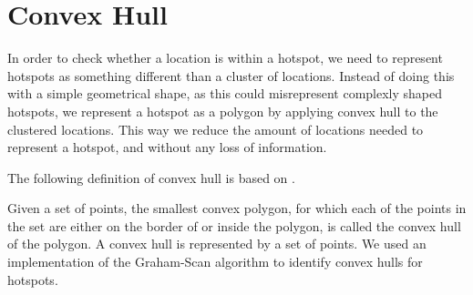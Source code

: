 \section{Convex Hull}\label{convex_hull}
In order to check whether a location is within a hotspot, we need to represent hotspots as something different than a cluster of locations.
Instead of doing this with a simple geometrical shape, as this could misrepresent complexly shaped hotspots, we represent a hotspot as a polygon by applying convex hull to the clustered locations.
This way we reduce the amount of locations needed to represent a hotspot, and without any loss of information.

The following definition of convex hull is based on \citet[section 33.3]{aadbook}.

Given a set of points, the smallest convex polygon, for which each of the points in the set are either on the border of or inside the polygon, is called the convex hull of the polygon\cite[33.1-5]{aadbook}.
A convex hull is represented by a set of points.
We used an implementation of the Graham-Scan\cite[page 1031]{aadbook} algorithm to identify convex hulls for hotspots.
